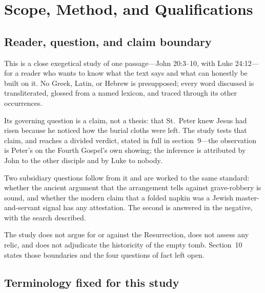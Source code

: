\section{Scope, Method, and Qualifications}

\subsection{Reader, question, and claim boundary}

This is a close exegetical study of one passage---John 20:3--10, with Luke
24:12---for a reader who wants to know what the text says and what can honestly
be built on it. No Greek, Latin, or Hebrew is presupposed; every word discussed
is transliterated, glossed from a named lexicon, and traced through its other
occurrences.

Its governing question is a claim, not a thesis: that St.\ Peter knew Jesus had
risen because he noticed how the burial cloths were left. The study tests that
claim, and reaches a divided verdict, stated in full in section~9---the
observation is Peter's on the Fourth Gospel's own showing; the inference is
attributed by John to the other disciple and by Luke to nobody.

Two subsidiary questions follow from it and are worked to the same standard:
whether the ancient argument that the arrangement tells against grave-robbery
is sound, and whether the modern claim that a folded napkin was a Jewish
master-and-servant signal has any attestation. The second is answered in the
negative, with the search described.

The study does not argue for or against the Resurrection, does not assess any
relic, and does not adjudicate the historicity of the empty tomb. Section~10
states those boundaries and the four questions of fact left open.

\subsection{Terminology fixed for this study}

